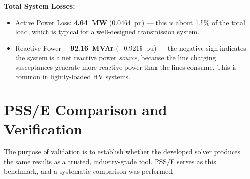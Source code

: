\documentclass[12pt, a4paper]{article}
\begin{document}
\begin{table}[htbp]
\centering
\caption{Line Flows and Losses at Convergence}
\label{tab:line_flows}
\end{table}

\textbf{Total System Losses:}
\begin{itemize}
    \item Active Power Loss: \textbf{4.64~MW} (0.0464~pu) --- this is about 1.5\% of the total load, which is typical for a well-designed transmission system.
    \item Reactive Power: \textbf{$-$92.16~MVAr} ($-$0.9216~pu) --- the negative sign indicates the system is a net reactive power \textit{source}, because the line charging susceptances generate more reactive power than the lines consume. This is common in lightly-loaded HV systems.
\end{itemize}

\newpage
\section{PSS/E Comparison and Verification}

The purpose of validation is to establish whether the developed solver produces the same results as a trusted, industry-grade tool. PSS/E serves as this benchmark, and a systematic comparison was performed.
\end{document}
